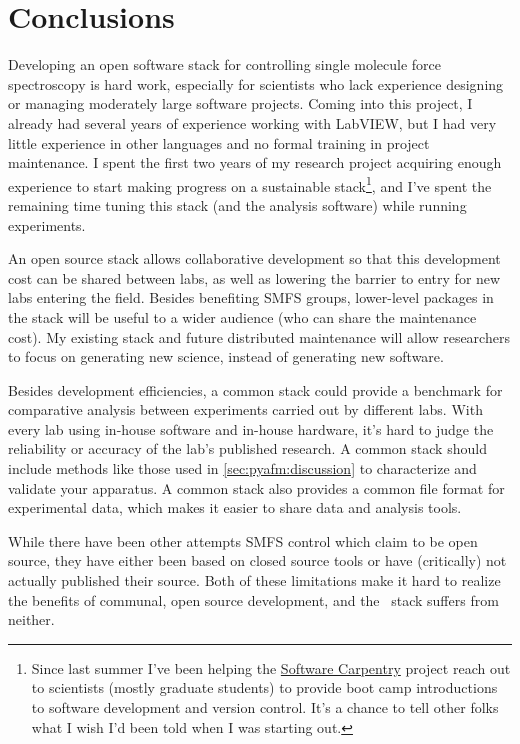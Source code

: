 \section{Conclusions}
\label{sec:pyafm:conclusions}

Developing an open software stack for controlling single molecule
force spectroscopy is hard work, especially for scientists who lack
experience designing or managing moderately large software projects.
Coming into this project, I already had several years of experience
working with LabVIEW, but I had very little experience in other
languages and no formal training in project maintenance.  I spent the
first two years of my research project acquiring enough experience to
start making progress on a sustainable stack\footnote{%
  Since last summer I've been helping the
  \href{http://software-carpentry.org/}{Software Carpentry}
  project\citep{wilson06b} reach out to scientists (mostly graduate
  students) to provide boot camp introductions to software development
  and version control.  It's a chance to tell other folks what I wish
  I'd been told when I was starting out.
}, and I've spent the remaining time tuning this stack (and the
analysis software) while running experiments.

An open source stack allows collaborative development so that this
development cost can be shared between labs, as well as lowering the
barrier to entry for new labs entering the field.  Besides benefiting
SMFS groups, lower-level packages in the stack will be useful to a
wider audience (who can share the maintenance cost).  My existing
stack and future distributed maintenance will allow researchers to
focus on generating new science, instead of generating new software.

Besides development efficiencies, a common stack could provide a
benchmark for comparative analysis between experiments carried out by
different labs.  With every lab using in-house software and in-house
hardware, it's hard to judge the reliability or accuracy of the lab's
published research.  A common stack should include methods like those
used in \cref{sec:pyafm:discussion} to characterize and validate your
apparatus.  A common stack also provides a common file format for
experimental data, which makes it easier to share data and analysis
tools.

While there have been other attempts SMFS control which claim to be
open source, they have either been based on closed source
tools\citep{aioanei11} or have (critically) not actually published
their source\citep{materassi09}.  Both of these limitations make it
hard to realize the benefits of communal, open source development, and
the \pyafm\ stack suffers from neither.
